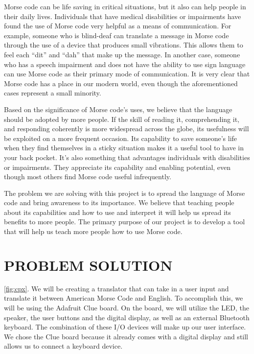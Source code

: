 \documentclass[12pt]{article}
\begin{document}
	Morse code can be life saving in critical situations, but it also can help people in their daily lives. Individuals that have medical disabilities or impairments have found the use of Morse code very helpful as a means of communication. For example, someone who is blind-deaf can translate a message in Morse code through the use of a device that produces small vibrations. This allows them to feel each “dit” and “dah” that make up the message. In another case, someone who has a speech impairment and does not have the ability to use sign language can use Morse code as their primary mode of communication. It is very clear that Morse code has a place in our modern world, even though the aforementioned cases represent a small minority.
	
	Based on the significance of Morse code’s uses, we believe that the language should be adopted by more people. If the skill of reading it, comprehending it, and responding coherently is more widespread across the globe, its usefulness will be exploited on a more frequent occasion. Its capability to save someone’s life when they find themselves in a sticky situation makes it a useful tool to have in your back pocket. It’s also something that advantages individuals with disabilities or impairments. They appreciate its capability and enabling potential, even though most others find Morse code useful infrequently.
	
	The problem we are solving with this project is to spread the language of Morse code and bring awareness to its importance. We believe that teaching people about its capabilities and how to use and interpret it will help us spread its benefits to more people. The primary purpose of our project is to develop a tool that will help us teach more people how to use Morse code.
	
	\section{PROBLEM SOLUTION}
	 \ref{fig:cpx}. We will be creating a translator that can take in a user input and translate it between American Morse Code and English. 
	 To accomplish this, we will be using the Adafruit Clue board. On the board, we will utilize the LED, the speaker, the user buttons and the digital display, as well as an external Bluetooth keyboard. The combination of these I/O devices will make up our user interface. We chose the Clue board because it already comes with a digital display and still allows us to connect a keyboard device.
	 
\end{document}
